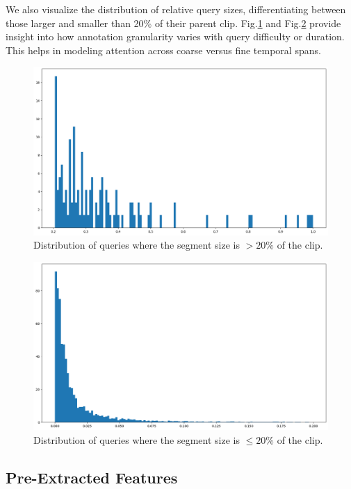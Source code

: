 \documentclass[10pt,twocolumn,letterpaper]{article}
\begin{document}
We also visualize the distribution of relative query sizes, differentiating between those larger and smaller than 20\% of their parent clip. Fig.\ref{fig:query_gt_0_2} and Fig.\ref{fig:query_lte_0_2} provide insight into how annotation granularity varies with query difficulty or duration. This helps in modeling attention across coarse versus fine temporal spans.
	
	\begin{figure}[htbp]
		\centering
		\includegraphics[width=0.8\linewidth]{relative_distribution_of_query_sizes_gt_0_2.png}
		\caption{Distribution of queries where the segment size is $> 20\%$ of the clip.}
		\label{fig:query_gt_0_2}
		
	\end{figure}
	
	\begin{figure}[htbp]
		\centering
		\includegraphics[width=0.8\linewidth]{relative_distribution_of_query_sizes_lte_0_2.png}
		\caption{Distribution of queries where the segment size is $ \leqslant 20\%$ of the clip.}
		\label{fig:query_lte_0_2}
	\end{figure}
	
	
	
	
\subsection{Pre-Extracted Features}
	
\end{document}
